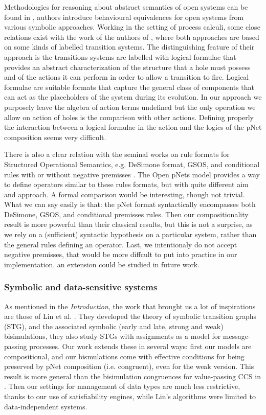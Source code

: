 \documentclass{lmcs}
\begin{document}
Methodologies for reasoning about abstract semantics of open systems can be found in \cite{BaldanBB:2002, BaldanBB:07,Dubut:20}, authors introduce  behavioural equivalences for open systems from various symbolic approaches. Working in the setting of process calculi, some close relations  exist with the work  of the authors of \cite{BaldanBB:2002,BaldanBB:07}, where both approaches are based
on some kinds of labelled transition systems. The distinguishing feature of their approach is the transitions systems are labelled with logical formulae that provides  an abstract characterization of the structure that a hole must possess and of the actions it can perform in order to allow a transition to fire. Logical formulae are suitable formats that capture the general class of components that can act as the placeholders of the system during its evolution. In our approach we purposely leave the algebra of action terms undefined but the only operation we allow on action of holes is the comparison with other actions. Defining properly the interaction between a logical formulae in the action and the logics of the pNet composition seems very difficult.

There is also a clear relation with the seminal works on rule formats for Structured Operational Semantics, e.g. DeSimone format, GSOS, and conditional rules with or without negative premisses \cite{deSimone85,Bloom88bisimulationcant,GROOTE1992202,VANGLABBEEK2004229}.  The Open pNets model provides a way to define operators similar to these rules formats, but with quite different aim and approach. A formal comparison would be interesting, though not trivial. What we can say easily is that: the pNet format syntactically encompasses both DeSimone, GSOS, and conditional premisses rules. Then our compositionality result is more powerful than their classical results, but this is not a surprise, as we rely on a (sufficient) syntactic hypothesis on a particular system, rather than the general rules defining an operator.  Last, we intentionaly do not accept negative premisses, that would be more diffcult to put into practice in our implementation. an extension could be studied in future work.

\subsubsection*{Symbolic and data-sensitive systems}
 As mentioned in the \emph{Introduction}, the work that brought us a lot of inspirations are those of Lin et al. \cite{IngolfsdottirL:2001,HennessyLin:TCS95,Linconcur96}. They developed the theory of symbolic transition graphs (STG), and the associated symbolic (early and late, strong and weak) bisimulations, they also study STGs with assignments as a model for message-passing processes. Our work extends these in several ways: first our models are compositional, and our bismulations come with effective conditions for being preserved by pNet composition (i.e. congruent), even for the weak version. This result is more general than the bisimulation congruences for value-passing CCS in \cite{IngolfsdottirL:2001}. Then our settings for management of data types are much less restrictive, thanks to our use of satisfiability engines, while Lin's algorithms were limited to data-independent systems. 
\end{document}
